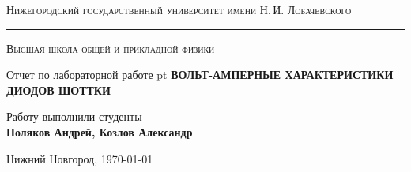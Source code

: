 \begin{titlepage}
    \begin{center}
    {\small\textsc{Нижегородский государственный университет имени Н.\,И. Лобачевского}}
    \vskip 2pt \hrule \vskip 3pt
    {\small\textsc{Высшая школа общей и прикладной физики}}

    \vfill


    {{\large Отчет по лабораторной работе} pt {\Large \bfseries ВОЛЬТ-АМПЕРНЫЕ ХАРАКТЕРИСТИКИ ДИОДОВ ШОТТКИ}}

        
    \vspace{2cm}
    {\large Работу выполнили студенты \\[0.5em]{\Large \bfseries Поляков Андрей, Козлов Александр}}

    \end{center}

    \vfill

    \begin{center}
    {Нижний Новгород, \today}
    \end{center}
\end{titlepage}